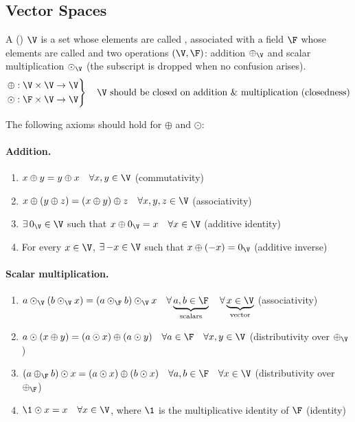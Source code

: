 \subsection{Vector Spaces}\label{ss:vector-spaces}

\begin{definition}
A  () $\V$ is a set whose elements are called , associated with a field $\F$ whose elements are called  and two operations $(\V,\F)$: addition $\oplus_{\V}$ and scalar multiplication $\odot_{\V}$ (the subscript is dropped when no confusion arises).
\[
\left.\begin{aligned}
\oplus &: \V\times\V\to\V\\
\odot &: \F\times\V\to\V
\end{aligned}\right\}\quad \text{$\V$ should be closed on addition \& multiplication (closedness)}
\]
\end{definition}

The following axioms should hold for $\oplus$ and $\odot$:

\paragraph{Addition.}
\begin{enumerate}[label=(A\arabic*),leftmargin=3.2em]
\item $x\oplus y = y\oplus x \quad \forall x,y\in\V$ \hfill (commutativity)
\item $x\oplus(y\oplus z) = (x\oplus y)\oplus z \quad \forall x,y,z\in\V$ \hfill (associativity)
\item $\exists\, 0_{\V}\in\V$ such that $x\oplus 0_{\V} = x \quad \forall x\in\V$ \hfill (additive identity)
\item For every $x\in\V$, $\exists\, {-x}\in\V$ such that $x\oplus(-x) = 0_{\V}$ \hfill (additive inverse)
\end{enumerate}

\paragraph{Scalar multiplication.}
\begin{enumerate}[label=(SM\arabic*),leftmargin=3.8em]
\item $a\odot_{\V}(b\odot_{\V} x) = (a\odot_{\F} b)\odot_{\V} x \quad \forall \underbrace{a,b\in\F}_{\text{scalars}} \quad \forall \underbrace{x\in\V}_{\text{vector}}$ \hfill (associativity)
\item $a\odot(x\oplus y) = (a\odot x)\oplus(a\odot y) \quad \forall a\in\F \quad \forall x,y\in\V$ \hfill (distributivity over $\oplus_{\V}$)
\item $(a\oplus_{\F} b)\odot x = (a\odot x)\oplus(b\odot x) \quad \forall a,b\in\F \quad \forall x\in\V$ \hfill (distributivity over $\oplus_{\F}$)
\item $\1\odot x = x \quad \forall x\in\V$, where $\1$ is the multiplicative identity of $\F$ \hfill (identity)
\end{enumerate}

